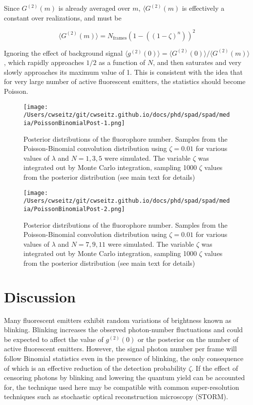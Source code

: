 Since $G^{(2)}(m)$ is already averaged over $m$, $\langle G^{(2)}(m) $ is effectively a constant over realizations, and must be

\begin{equation}
\langle G^{(2)}(m)\rangle =  N_{\mathrm{frames}} \left(1 - \left((1-\zeta)^n\right)\right)^2
\end{equation}

Ignoring the effect of background signal $\langle g^{(2)}(0)\rangle =\langle G^{(2)}(0)\rangle/\langle G^{(2)}(m)\rangle$, which rapidly approaches $1/2$ as a function of $N$, and then saturates and very slowly approaches its maximum value of 1. This is consistent with the idea that for very large number of active fluorescent emitters, the statistics should become Poisson.


\begin{figure*}[t]
\centering
\texttt{[image: /Users/cwseitz/git/cwseitz.github.io/docs/phd/spad/spad/media/PoissonBinomialPost-1.png]}
\caption{Posterior distributions of the fluorophore number. Samples from the Poisson-Binomial convolution distribution using $\zeta=0.01$ for various values of $\lambda$ and $N=1,3,5$ were simulated. The variable $\zeta$ was integrated out by Monte Carlo integration, sampling 1000 $\zeta$ values from the posterior distribution (see main text for details)}
\end{figure*}    

\begin{figure*}[t]
\centering
\texttt{[image: /Users/cwseitz/git/cwseitz.github.io/docs/phd/spad/spad/media/PoissonBinomialPost-2.png]}
\caption{Posterior distributions of the fluorophore number. Samples from the Poisson-Binomial convolution distribution using $\zeta=0.01$ for various values of $\lambda$ and $N=7,9,11$ were simulated. The variable $\zeta$ was integrated out by Monte Carlo integration, sampling 1000 $\zeta$ values from the posterior distribution (see main text for details)}
\end{figure*}    



\section{Discussion}

Many fluorescent emitters exhibit random variations of brightness known as blinking. Blinking increases the observed photon-number fluctuations and could be expected to affect the value of $g^{(2)}(0)$ or the posterior on the number of active fluorescent emitters. However, the signal photon number per frame will follow Binomial statistics even in the presence of blinking, the only consequence of which is an effective reduction of the detection probability $\zeta$. If the effect of censoring photons by blinking and lowering the quantum yield can be accounted for, the technique used here may be compatible with common super-resolution techniques such as stochastic optical reconstruction microscopy (STORM). 


